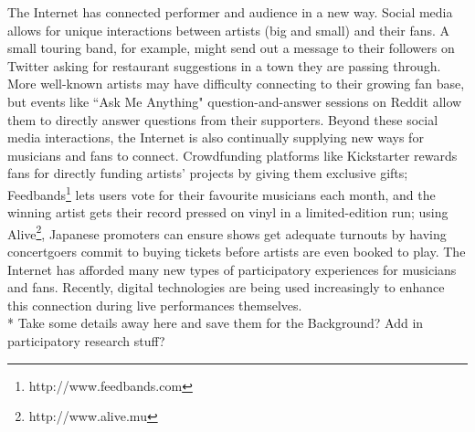 The Internet has connected performer and audience in a new way. Social media allows for unique interactions between artists (big and small) and their fans. A small touring band, for example, might send out a message to their followers on Twitter asking for restaurant suggestions in a town they are passing through. More well-known artists may have difficulty connecting to their growing fan base, but events like ``Ask Me Anything" question-and-answer sessions on Reddit allow them to directly answer questions from their supporters. Beyond these social media interactions, the Internet is also continually supplying new ways for musicians and fans to connect. Crowdfunding platforms like Kickstarter rewards fans for directly funding artists' projects by giving them exclusive gifts; Feedbands\footnote{http://www.feedbands.com} lets users vote for their favourite musicians each month, and the winning artist gets their record pressed on vinyl in a limited-edition run; using Alive\footnote{http://www.alive.mu}, Japanese promoters can ensure shows get adequate turnouts by having concertgoers commit to buying tickets before artists are even booked to play. The Internet has afforded many new types of participatory experiences for musicians and fans. Recently, digital technologies are being used increasingly to enhance this connection during live performances themselves.\\

* Take some details away here and save them for the Background? Add in participatory research stuff?

